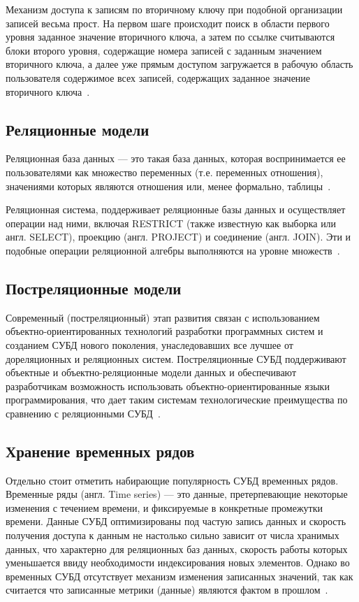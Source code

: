 Механизм доступа к записям по вторичному ключу при подобной организации записей весьма прост. На первом шаге происходит поиск в области первого уровня заданное значение вторичного ключа, а затем по ссылке считываются блоки второго уровня, содержащие номера записей с заданным значением вторичного ключа, а далее уже прямым доступом загружается в рабочую область пользователя содержимое всех записей, содержащих заданное значение вторичного ключа~\cite{inverted-lists}.


\subsection{Реляционные модели}
Реляционная база данных — это такая база данных, которая воспринимается ее пользователями как множество переменных (т.е. переменных отношения), значениями которых являются отношения или, менее формально, таблицы~\cite{williams-db}.

Реляционная система, поддерживает реляционные базы данных и осуществляет операции над ними, включая RESTRICT (также известную как выборка или англ. SELECT), проекцию (англ. PROJECT) и соединение (англ. JOIN). Эти и подобные операции реляционной алгебры выполняются на уровне множеств~\cite{williams-db}.

\subsection{Постреляционные модели}
Современный (постреляционный) этап развития связан с использованием объектно-ориентированных технологий разработки программных систем и созданием СУБД нового поколения, унаследовавших все лучшее от дореляционных и реляционных систем. Постреляционные СУБД поддерживают 
объектные и объектно-реляционные модели данных и обеспечивают разработчикам возможность использовать объектно-ориентированные языки программирования, что дает таким системам технологические преимущества по сравнению с реляционными СУБД~\cite{wolf-db}.

\subsection{Хранение временных рядов}
Отдельно стоит отметить набирающие популярность СУБД временных рядов. Временные ряды (англ. Time series) --- это данные, 
претерпевающие некоторые изменения с течением 
времени, и фиксируемые в конкретные промежутки 
времени. Данные СУБД оптимизированы под частую запись данных и скорость получения доступа к данным не настолько сильно зависит от числа хранимых данных, что характерно для реляционных баз данных, скорость работы которых уменьшается ввиду необходимости индексирования новых элементов. Однако во временных СУБД отсутствует механизм изменения записанных значений, так как считается что записанные метрики (данные) являются фактом в прошлом~\cite{time_db}.

